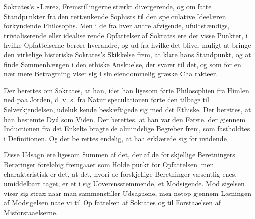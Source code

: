 \documentclass[12pt,a4paper]{book}
\begin{document}
Sokrates's «Lære», Fremstillingerne stærkt divergerende, og om\-%
fatte Standpunkter fra den rettænkende Sophists til den spe\-%
culative Ideelæren forkyndende Philosophs. Men i de fra hver\-%
andre afvigende, ufuldstændige, trivialiserende eller idealise\-%
rende Opfattelser af Sokrates ere der visse Punkter, i hvilke
Opfattelserne berøre hverandre, og ud fra hvilke det bliver
muligt at bringe den virkelige historiske Sokrates's Skikkelse
frem, at klare hans Standpunkt, og at finde Sammenhængen i
den ethiske Anskuelse, der svarer til det, og som for en nær\-%
mere Betragtning viser sig i sin eiendommelig græske Cha\-%
rakteer.

Der berettes om Sokrates, at han, idet han ligesom førte
Philosophien fra Himlen ned paa Jorden, d. v. s. fra Natur\-%
speculationen førte den tilbage til Selverkjendelsen, udeluk\-%
kende beskæftigede sig med det Ethiske. Der berettes, at han
bestemte Dyd som Viden. Der berettes, at han var den Første,
der gjennem Inductionen fra det Enkelte bragte de almindelige
Begreber frem, som fastholdtes i Definitionen. Og der be\-%
rettes endelig, at han erklærede sig for uvidende.

Disse Udsagn ere ligesom Summen af det, der af de for\-%
skjellige Beretningers Berøringer foreløbig fremgaaer som Holde\-%
punkt for Opfattelsen; men charakteristisk er det, at det,
hvori de forskjellige Beretninger væsentlig enes, umiddelbart
taget, er et i sig Uoverensstemmende, et Modsigende. Mod\-%
sigelsen viser sig strax naar man sammenstiller Udsagnene,
men netop gjennem Løsningen af Modsigelsen naae vi til Op\-%
fattelsen af Sokrates og til Forstaaelsen af Misforstaaelserne.
\end{document}
